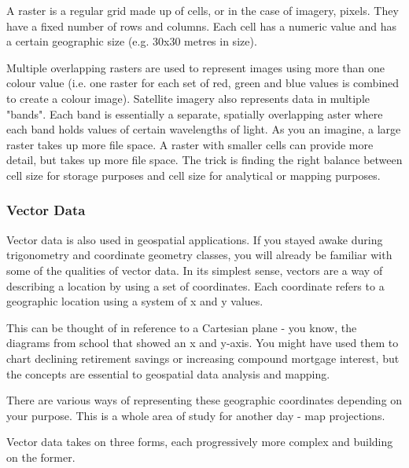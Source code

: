 A raster is a regular grid made up of cells, or in the case of imagery,
pixels. They have a fixed number of rows and columns. Each cell has a
numeric value and has a certain geographic size (e.g. 30x30 metres in
size).

Multiple overlapping rasters are used to represent images using more than
one colour value (i.e. one raster for each set of red, green and blue
values is combined to create a colour image). Satellite imagery also
represents data in multiple "bands". Each band is essentially a separate,
spatially overlapping aster where each band holds values of certain
wavelengths of light. As you an imagine, a large raster takes up more file
space. A raster with smaller cells can provide more detail, but takes up
more file space. The trick is finding the right balance between cell size
for storage purposes and cell size for analytical or mapping purposes.

\subsubsection{Vector Data}\label{label_vectordata}

Vector data is also used in geospatial applications. If you stayed awake
during trigonometry and coordinate geometry classes, you will already be
familiar with some of the qualities of vector data. In its simplest sense,
vectors are a way of describing a location by using a set of coordinates.
Each coordinate refers to a geographic location using a system of x and y
values.

This can be thought of in reference to a Cartesian plane - you know, the
diagrams from school that showed an x and y-axis. You might have used them
to chart declining retirement savings or increasing compound mortgage
interest, but the concepts are essential to geospatial data analysis and
mapping.

There are various ways of representing these geographic coordinates
depending on your purpose. This is a whole area of study for another day -
map projections.

Vector data takes on three forms, each progressively more complex and
building on the former.  

